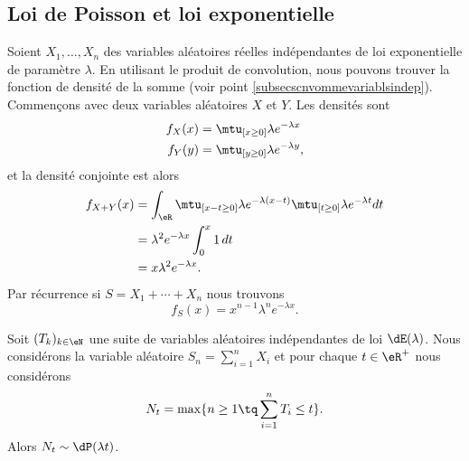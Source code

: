 \subsection{Loi de Poisson et loi exponentielle}
\label{subsecPoissonetexpo}

Soient \( X_1,\ldots,X_n\) des variables aléatoires réelles indépendantes de loi exponentielle de paramètre \( \lambda\). En utilisant le produit de convolution, nous pouvons trouver la fonction de densité de la somme (voir point \ref{subsecscnvommevariablsindep}). Commençons avec deux variables aléatoires \( X\) et \( Y\). Les densités sont
\begin{subequations}
    \begin{align}
        f_X(x)&=\mtu_{[x\geq 0]}\lambda e^{-\lambda x}\\
        f_Y(y)&=\mtu_{[y\geq 0]}\lambda e^{-\lambda y},
    \end{align}
\end{subequations}
et la densité conjointe est alors
\begin{subequations}
    \begin{align}
        f_{X+Y}(x)&=\int_{\eR}\mtu_{[x-t\geq 0]}\lambda e^{-\lambda(x-t)}\mtu_{[t\geq 0]}\lambda e^{-\lambda t}dt\\
        &=\lambda^2 e^{-\lambda x}\int_0^x1\,dt\\
        &=x\lambda^2 e^{-\lambda x}.
    \end{align}
\end{subequations}
Par récurrence si \( S=X_1+\cdots+X_n\) nous trouvons
\begin{equation}
    f_S(x)=x^{n-1}\lambda^n e^{-\lambda x}.
\end{equation}

\begin{proposition}      \label{PropGMntiy}
Soit \( (T_k)_{k\in\eN}\) une suite de variables aléatoires indépendantes de loi \( \dE(\lambda)\). Nous considérons la variable aléatoire \( S_n=\sum_{i=1}^nX_i\) et pour chaque \( t\in\eR^+\) nous considérons
\begin{equation}
    N_t=\max\{ n\geq 1\tq \sum_{i=1}^nT_i\leq t \}.
\end{equation}
Alors \( N_t\sim\dP(\lambda t)\). 

\end{proposition}

